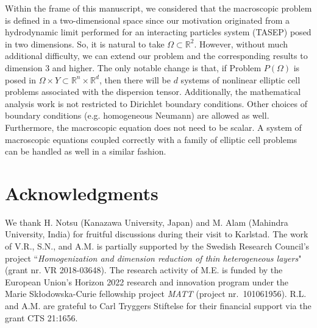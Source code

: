 \documentclass[11pt]{article}
\begin{document}
Within the frame of this manuscript, we considered that the macroscopic problem is defined in a two-dimensional space since our motivation originated from a hydrodynamic limit performed for an interacting particles system (TASEP) posed in two dimensions. 
So, it is natural to take $\Omega\subset \mathbb{R}^2$. 
However, without much additional difficulty, we can extend our problem and the corresponding results to dimension $3$ and higher. 
The only notable change is that, if Problem $P(\Omega)$ is posed in $\Omega\times Y\subset \mathbb{R}^n\times \mathbb{R}^d$, then there will be $d$ systems of nonlinear elliptic cell problems associated with the dispersion tensor. 
Additionally, the mathematical analysis work is not restricted to Dirichlet boundary conditions.
Other choices of boundary conditions (e.g. homogeneous Neumann) are allowed as well. 
Furthermore, the macroscopic equation does not need to be scalar. 
A system of macroscopic equations coupled correctly with a family of elliptic cell problems can be handled as well in a similar fashion.



 
    
\section*{Acknowledgments} We thank  H. Notsu (Kanazawa University, Japan) and M. Alam (Mahindra University, India) for fruitful discussions during their visit to Karlstad. 
The work of V.R., S.N., and A.M. is partially supported by the Swedish Research Council's project ``{\em  Homogenization and dimension reduction of thin heterogeneous layers}" (grant nr. VR 2018-03648).
The research activity of M.E. is funded by the European Union’s Horizon 2022 research and innovation program under the Marie Skłodowska-Curie fellowship project {\em{MATT}} (project nr.~101061956).
R.L. and A.M. are grateful to Carl Tryggers Stiftelse for their financial support via the grant CTS 21:1656.
 
	
\end{document}
